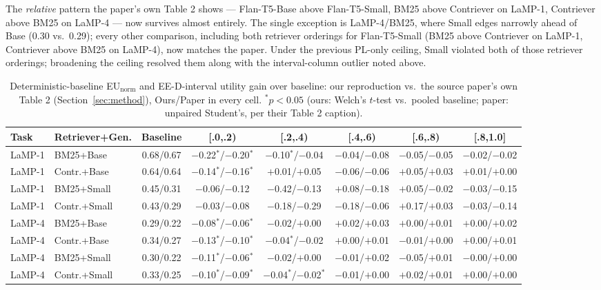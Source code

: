 \documentclass[10pt,twocolumn]{article}
\begin{document}
The \emph{relative} pattern the paper's own Table 2 shows --- Flan-T5-Base above
Flan-T5-Small, BM25 above Contriever on LaMP-1, Contriever above BM25 on LaMP-4 ---
now survives almost entirely. The single exception is LaMP-4/BM25, where Small edges
narrowly ahead of Base (0.30 vs.\ 0.29); every other comparison, including both
retriever orderings for Flan-T5-Small (BM25 above Contriever on LaMP-1, Contriever
above BM25 on LaMP-4), now matches the paper. Under the previous PL-only ceiling,
Small violated both of those retriever orderings; broadening the ceiling resolved
them along with the interval-column outlier noted above.

\begin{table}[t]
\centering
\scriptsize
\caption{Deterministic-baseline EU$_{\text{norm}}$ and EE-D-interval utility gain over
baseline: our reproduction vs.\ the source paper's own Table 2 (Section~\ref{sec:method}),
Ours/Paper in every cell. $^*p{<}0.05$ (ours: Welch's $t$-test vs.\ pooled baseline;
paper: unpaired Student's, per their Table 2 caption).}
\label{tab:baseline}
\begin{tabular}{@{}llcccccc@{}}
\toprule
Task & Retriever+Gen. & Baseline & [.0,.2) & [.2,.4) & [.4,.6) & [.6,.8) & [.8,1.0] \\
\midrule
LaMP-1 & BM25+Base   & 0.68/0.67 & $-$0.22$^{*}$/$-$0.20$^{*}$ & $-$0.10$^{*}$/$-$0.04 & $-$0.04/$-$0.08 & $-$0.05/$-$0.05 & $-$0.02/$-$0.02 \\
LaMP-1 & Contr.+Base & 0.64/0.64 & $-$0.14$^{*}$/$-$0.16$^{*}$ & $+$0.01/$+$0.05 & $-$0.06/$-$0.06 & $+$0.05/$+$0.03 & $+$0.01/$+$0.00 \\
LaMP-1 & BM25+Small  & 0.45/0.31 & $-$0.06/$-$0.12 & $-$0.42/$-$0.13 & $+$0.08/$-$0.18 & $+$0.05/$-$0.02 & $-$0.03/$-$0.15 \\
LaMP-1 & Contr.+Small& 0.43/0.29 & $-$0.03/$-$0.08 & $-$0.18/$-$0.29 & $-$0.18/$-$0.06 & $+$0.17/$+$0.03 & $-$0.03/$-$0.14 \\
\midrule
LaMP-4 & BM25+Base   & 0.29/0.22 & $-$0.08$^{*}$/$-$0.06$^{*}$ & $-$0.02/$+$0.00 & $+$0.02/$+$0.03 & $+$0.00/$+$0.01 & $+$0.00/$+$0.02 \\
LaMP-4 & Contr.+Base & 0.34/0.27 & $-$0.13$^{*}$/$-$0.10$^{*}$ & $-$0.04$^{*}$/$-$0.02 & $+$0.00/$+$0.01 & $-$0.01/$+$0.00 & $+$0.00/$+$0.01 \\
LaMP-4 & BM25+Small  & 0.30/0.22 & $-$0.11$^{*}$/$-$0.06$^{*}$ & $-$0.02/$+$0.00 & $-$0.01/$+$0.02 & $-$0.05/$+$0.01 & $-$0.00/$+$0.00 \\
LaMP-4 & Contr.+Small& 0.33/0.25 & $-$0.10$^{*}$/$-$0.09$^{*}$ & $-$0.04$^{*}$/$-$0.02$^{*}$ & $-$0.01/$+$0.00 & $+$0.02/$+$0.01 & $+$0.00/$+$0.00 \\
\bottomrule
\end{tabular}
\end{table}
\end{document}
